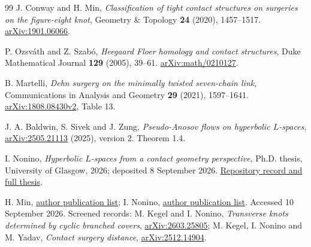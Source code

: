 \documentclass[12pt]{amsart}
\theoremstyle{definition}
\theoremstyle{remark}
\numberwithin{equation}{section}
\theoremstyle{definition}
\begin{document}
\begin{thebibliography}{99}
J. Conway and H. Min, \emph{Classification of tight contact structures on surgeries on the figure-eight knot}, Geometry \& Topology \textbf{24} (2020), 1457--1517. \href{https://arxiv.org/abs/1901.06066}{arXiv:1901.06066}.

P. Ozsv\'ath and Z. Szab\'o, \emph{Heegaard Floer homology and contact structures}, Duke Mathematical Journal \textbf{129} (2005), 39--61. \href{https://arxiv.org/abs/math/0210127}{arXiv:math/0210127}.

B. Martelli, \emph{Dehn surgery on the minimally twisted seven-chain link}, Communications in Analysis and Geometry \textbf{29} (2021), 1597--1641. \href{https://arxiv.org/abs/1808.08430}{arXiv:1808.08430v2}, Table 13.

J. A. Baldwin, S. Sivek and J. Zung, \emph{Pseudo-Anosov flows on hyperbolic $L$-spaces}, \href{https://arxiv.org/abs/2505.21113}{arXiv:2505.21113} (2025), version 2. Theorem 1.4.

I. Nonino, \emph{Hyperbolic $L$-spaces from a contact geometry perspective}, Ph.D. thesis, University of Glasgow, 2026; deposited 8 September 2026. \href{https://theses.gla.ac.uk/86215/}{Repository record and full thesis}.

H. Min, \href{https://hkmin27.github.io/}{author publication list}; I. Nonino, \href{https://sites.google.com/view/isaccononinomath/home-page}{author publication list}. Accessed 10 September 2026. Screened records: M. Kegel and I. Nonino, \emph{Transverse knots determined by cyclic branched covers}, \href{https://arxiv.org/abs/2603.25805}{arXiv:2603.25805}; M. Kegel, I. Nonino and M. Yadav, \emph{Contact surgery distance}, \href{https://arxiv.org/abs/2512.14904}{arXiv:2512.14904}.

\end{thebibliography}
\end{document}
